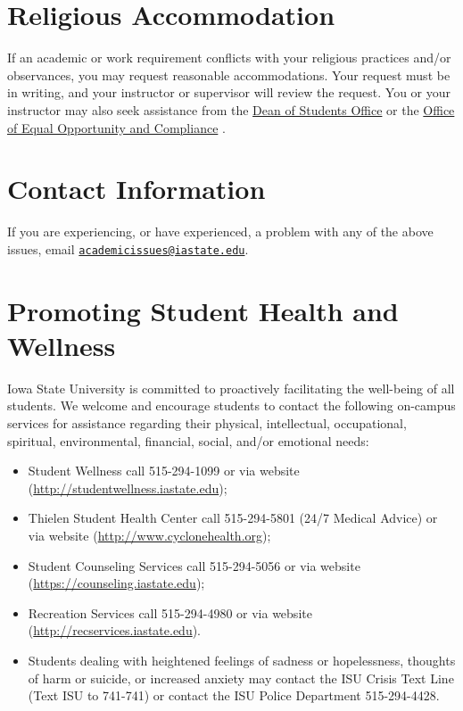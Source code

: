 \documentclass{article}
\begin{document}
\section{Religious Accommodation}
If an academic or work requirement conflicts with your religious practices and/or observances, you may
request reasonable accommodations. Your request must be in writing, and your instructor or supervisor
will review the request. You or your instructor may also seek assistance from
the \href{https://www.dso.iastate.edu/}{Dean of Students
Office} or the \href{https://www.eoc.iastate.edu/}{Office of Equal Opportunity and Compliance} .

\section{Contact Information}
If you are experiencing, or have experienced, a problem with any of the above
issues, email \href{mailto: academicissues@iastate.edu}{\tt academicissues@iastate.edu}.

\section{Promoting Student Health and Wellness}
Iowa State University is committed to proactively facilitating the well-being of all
students. We welcome and encourage students to contact the following on-campus services for assistance regarding their
physical, intellectual, occupational, spiritual, environmental, financial, social, and/or emotional needs:
\begin{itemize}
	
	\item Student Wellness call 515-294-1099 or via website
		(\url{http://studentwellness.iastate.edu});
	\item Thielen Student Health Center call 515-294-5801 (24/7 Medical
		Advice) or via website (\url{http://www.cyclonehealth.org});
	\item Student Counseling Services call 515-294-5056 or via website
		(\url{https://counseling.iastate.edu});
	\item Recreation Services call 515-294-4980 or via website
		(\url{http://recservices.iastate.edu}).
	\item Students dealing with heightened feelings of sadness or hopelessness, thoughts of harm or suicide, or increased anxiety may
contact the ISU Crisis Text Line (Text ISU to 741-741) or contact the ISU Police Department 515-294-4428.
\end{itemize}


	
\end{document}
